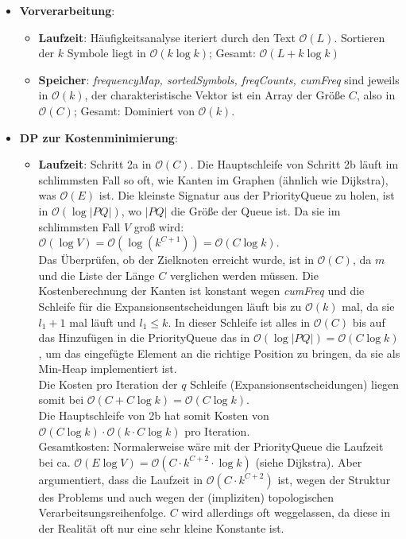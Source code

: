 \documentclass[a4paper,10pt,ngerman]{scrartcl}
\begin{document}
\begin{itemize}
  \item \textbf{Vorverarbeitung}:
  \begin{itemize}
    \item \textbf{Laufzeit}:
      Häufigkeitsanalyse iteriert durch den Text $\mathcal{O}(L)$. Sortieren der $k$ Symbole liegt in $\mathcal{O}(k \log k)$; Gesamt: $\mathcal{O}(L + k \log k)$
    \item \textbf{Speicher}: \textit{frequencyMap, sortedSymbols, freqCounts, cumFreq} sind jeweils in $\mathcal{O}(k)$, der cha\-rakteristische Vektor ist ein Array der Größe $C$, also in $\mathcal{O}(C)$; Gesamt: Dominiert von $\mathcal{O}(k)$.
  \end{itemize}
  \item \textbf{DP zur Kostenminimierung}:
  \begin{itemize}
    \item \textbf{Laufzeit}: Schritt 2a in $\mathcal{O}(C)$. Die Hauptschleife von Schritt 2b läuft im schlimmsten Fall so oft, wie Kanten im Graphen (ähnlich wie Dijkstra), was $\mathcal{O}(E)$ ist. Die kleinste Signatur aus der PriorityQueue zu holen, ist in $\mathcal{O}(\log |PQ|)$, wo $|PQ|$ die Größe der Queue ist. Da sie im schlimmsten Fall $V$ groß wird: $\mathcal{O}(\log V) = \mathcal{O}(\log (k^{C+1})) = \mathcal{O}(C\log k)$.\\
    Das Überprüfen, ob der Zielknoten erreicht wurde, ist in $\mathcal{O}(C)$, da $m$ und die Liste der Länge $C$ verglichen werden müssen. Die Kostenberechnung der Kanten ist konstant wegen \textit{cumFreq} und die Schleife für die Expansionsentscheidungen läuft bis zu $\mathcal{O}(k)$ mal, da sie $l_1 + 1$  mal läuft und $l_1 \le k$. In dieser Schleife ist alles in $\mathcal{O}(C)$ bis auf das Hinzufügen in die PriorityQueue das in $\mathcal{O}(\log |PQ|) = \mathcal{O}(C\log k)$, um das eingefügte Element an die richtige Position zu bringen, da sie als Min-Heap implementiert ist. \\
    Die Kosten pro Iteration der $q$ Schleife (Expansionsentscheidungen) liegen somit bei $\mathcal{O}(C+ C\log k)=\mathcal{O}(C\log k)$.\\
    Die Hauptschleife von 2b hat somit Kosten von $\mathcal{O}(C\log k) \cdot \mathcal{O}(k \cdot C \log k)$ pro Iteration.\\
    Gesamtkosten: Normalerweise wäre mit der PriorityQueue die Laufzeit bei ca. $\mathcal{O}(E \log V) = \mathcal{O}(C\cdot k^{C+2}\cdot \log k)$ (siehe Dijkstra). Aber \cite[Richtung Ende Kapitel 4]{papergolinrote} argumentiert, dass die Laufzeit in $\mathcal{O}(C\cdot k^{C+2})$ ist, wegen der Struktur des Problems und auch wegen der (impliziten) topologischen Verarbeitsungsreihenfolge. $C$ wird allerdings oft weggelassen, da diese in der Realität oft nur eine sehr kleine Konstante ist.

\end{itemize}
\end{itemize}
\end{document}
